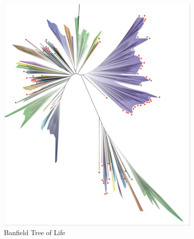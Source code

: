 \documentclass[]{article}
\begin{document}
\begin{figure}[H]
	\caption{Banfield Tree of Life}\label{fig:banfield:tol}
	\includegraphics[width=0.9\textwidth]{TOL4}
\end{figure}
\end{document}
